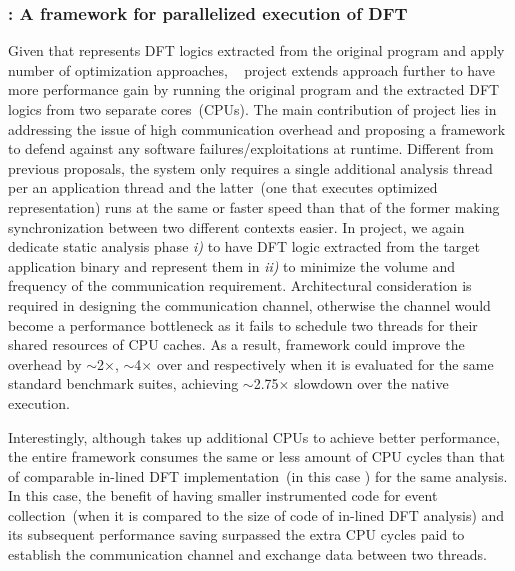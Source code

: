 \documentclass[letterpaper, 10pt]{article}
\begin{document}
\begin{small}
\subsubsection*{\SR: A framework for parallelized execution of DFT}
%
Given that \TFA represents DFT logics extracted from the original program and
apply number of optimization approaches, \SR~\cite{sreplica:2013ccs} project
extends \TFA approach further to have more performance gain by running the
original program and the extracted DFT logics from two separate cores~(CPUs).
%
%
The main contribution of \SR project lies in addressing the issue of high
communication overhead and proposing a framework  to defend against any
software failures/exploitations at runtime. Different from previous proposals,
the system only requires a single additional analysis thread per an application
thread and the latter~(one that executes optimized \TFA representation) runs at
the same or faster speed than that of the former making synchronization between
two different contexts easier.
%
In \SR project, we again dedicate static analysis phase {\it i)} to have DFT
logic extracted from the target application binary and represent them in \TFA
\xspace{\it ii)} to minimize the volume and frequency of the communication
requirement.
%
Architectural consideration is required in designing the communication channel,
otherwise the channel would become a performance bottleneck as it fails to
schedule two threads for their shared resources of CPU caches.
%
As a result, \SR framework could improve the overhead by $\sim$2$\times$,
$\sim$4$\times$ over \TFA and \libdft respectively when it is evaluated for the
same standard benchmark suites, achieving $\sim$2.75$\times$ slowdown over the
native execution.

Interestingly, although \SR takes up additional CPUs to achieve better
performance, the entire framework consumes the same or less amount of CPU
cycles than that of comparable in-lined DFT implementation~(in this case \TFA)
for the same analysis.
%
In this case, the benefit of having smaller instrumented code for event
collection~(when it is compared to the size of code of in-lined DFT analysis)
and its subsequent performance saving surpassed the extra CPU cycles paid to
establish the communication channel and exchange data between two threads.


\end{small}
\end{document}
